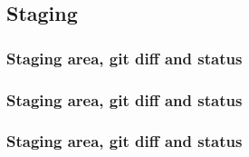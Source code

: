 \documentclass{beamer}
\begin{document}
    \subsection{Staging}\label{subsec:staging}
    \begin{frame}
        \frametitle{Staging area, git diff and status}
        \begin{figure}[H]
            \centering
            \noindent
            \label{fig:figure3}
        \end{figure}
    \end{frame}
    \begin{frame}
        \frametitle{Staging area, git diff and status}
        \begin{figure}[H]
            \centering
            \noindent
        \end{figure}
    \end{frame}
    \begin{frame}
        \frametitle{Staging area, git diff and status}
        \begin{figure}[H]
            \centering
            \noindent
            \label{fig:figure4}
        \end{figure}
    \end{frame}
\end{document}

